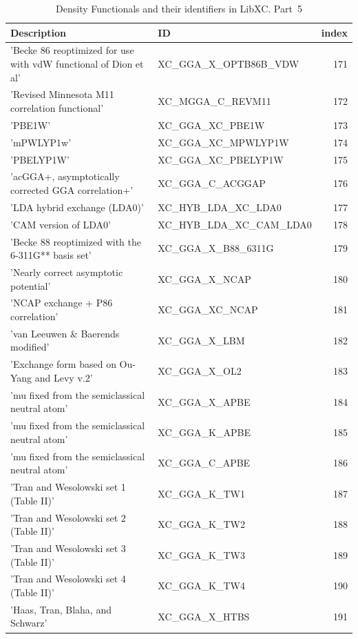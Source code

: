 \documentclass[final,12pt,makeidx,DIV=calc]{article}
\begin{document}
{{{\begin{table}[!h]
\caption{Density Functionals and their identifiers in LibXC. Part~5}
\begin{center}
\begin{tabular}{llr}
\hline
\hline
Description & ID & index\\
\hline
  'Becke 86 reoptimized for use with vdW functional of Dion et al' & XC\_GGA\_X\_OPTB86B\_VDW  &171\\
  'Revised Minnesota M11 correlation functional' & XC\_MGGA\_C\_REVM11  &172\\
  'PBE1W' & XC\_GGA\_XC\_PBE1W  &173\\
  'mPWLYP1w' & XC\_GGA\_XC\_MPWLYP1W  &174\\
  'PBELYP1W' & XC\_GGA\_XC\_PBELYP1W  &175\\
  'acGGA+, asymptotically corrected GGA correlation+' & XC\_GGA\_C\_ACGGAP  &176\\
  'LDA hybrid exchange (LDA0)' & XC\_HYB\_LDA\_XC\_LDA0  &177\\
  'CAM version of LDA0' & XC\_HYB\_LDA\_XC\_CAM\_LDA0  &178\\
  'Becke 88 reoptimized with the 6-311G** basis set' & XC\_GGA\_X\_B88\_6311G  &179\\
  'Nearly correct asymptotic potential' & XC\_GGA\_X\_NCAP  &180\\
  'NCAP exchange + P86 correlation' & XC\_GGA\_XC\_NCAP  &181\\
  'van Leeuwen \& Baerends modified' & XC\_GGA\_X\_LBM  &182\\
  'Exchange form based on Ou-Yang and Levy v.2' & XC\_GGA\_X\_OL2  &183\\
  'mu fixed from the semiclassical neutral atom' & XC\_GGA\_X\_APBE  &184\\
  'mu fixed from the semiclassical neutral atom' & XC\_GGA\_K\_APBE  &185\\
  'mu fixed from the semiclassical neutral atom' & XC\_GGA\_C\_APBE  &186\\
  'Tran and Wesolowski set 1 (Table II)' & XC\_GGA\_K\_TW1  &187\\
  'Tran and Wesolowski set 2 (Table II)' & XC\_GGA\_K\_TW2  &188\\
  'Tran and Wesolowski set 3 (Table II)' & XC\_GGA\_K\_TW3  &189\\
  'Tran and Wesolowski set 4 (Table II)' & XC\_GGA\_K\_TW4  &190\\
  'Haas, Tran, Blaha, and Schwarz' & XC\_GGA\_X\_HTBS  &191\\

\end{tabular}
\end{center}
\end{table}}}}
\end{document}
